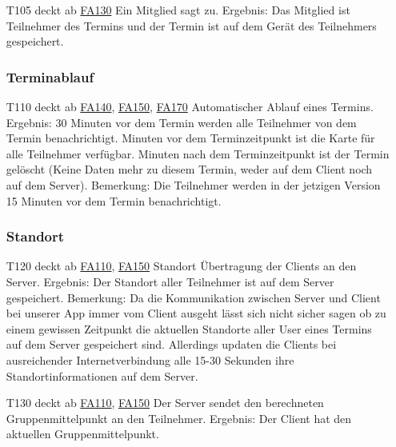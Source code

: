 \documentclass{scrartcl}
\begin{document}
\begin{itemize}
	\item[T105] deckt ab \hyperlink{FA130}{FA130}  \newline
	Ein Mitglied sagt zu.  \newline
	Ergebnis: Das Mitglied ist Teilnehmer des Termins und der Termin ist auf dem Gerät des Teilnehmers gespeichert.
	
	\subsubsection{Terminablauf}
	
	\item[T110] deckt ab \hyperlink{FA140}{FA140}, \hyperlink{FA150}{FA150}, \hyperlink{FA170}{FA170} \newline
	Automatischer Ablauf eines Termins. \newline
	Ergebnis: 30 Minuten vor dem Termin werden alle Teilnehmer von dem Termin benachrichtigt.   Minuten vor dem Terminzeitpunkt ist die Karte für alle Teilnehmer verfügbar.   Minuten nach dem Terminzeitpunkt ist der Termin gelöscht (Keine Daten mehr zu diesem Termin, weder auf dem Client noch auf dem Server).
	Bemerkung: Die Teilnehmer werden in der jetzigen Version 15 Minuten vor dem Termin benachrichtigt. 
	
	\subsubsection{Standort}
	\item[T120] deckt ab \hyperlink{FA110}{FA110}, \hyperlink{FA150}{FA150} \newline
	Standort Übertragung der Clients an den Server.  \newline
	Ergebnis: Der Standort aller Teilnehmer ist auf dem Server gespeichert. \newline
	Bemerkung: Da die Kommunikation zwischen Server und Client bei unserer App immer vom Client ausgeht lässt sich nicht sicher sagen ob zu einem gewissen Zeitpunkt die aktuellen Standorte aller User eines Termins auf dem Server gespeichert sind. Allerdings updaten die Clients bei ausreichender Internetverbindung alle 15-30 Sekunden ihre Standortinformationen auf dem Server.
	
	\item[T130]  deckt ab \hyperlink{FA110}{FA110}, \hyperlink{FA150}{FA150} \newline
	Der Server sendet den berechneten Gruppenmittelpunkt an den Teilnehmer. \newline
	Ergebnis: Der Client hat den aktuellen Gruppenmittelpunkt.
	
\end{itemize}	

\newpage
\hypertarget{Anhang}{}

\end{document}
